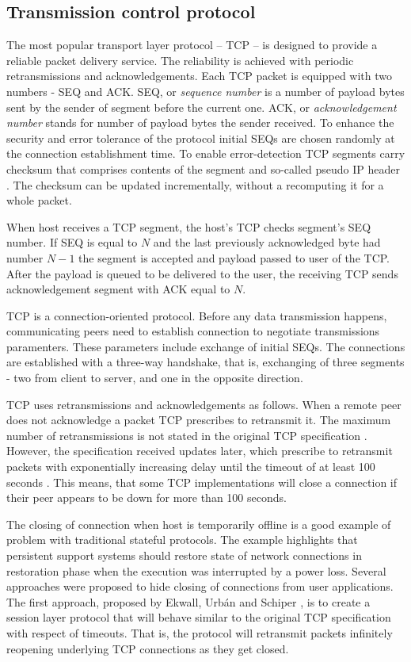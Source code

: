 \subsection{Transmission control protocol}

The most popular transport layer protocol -- TCP -- is designed to provide a 
reliable packet delivery service. The reliability is achieved with periodic
retransmissions and acknowledgements. Each TCP packet is equipped with two
numbers - SEQ and ACK. SEQ, or \textit{sequence number} is a number of payload
bytes sent by the sender of segment before the current one. ACK, or \textit{
acknowledgement number} stands for number of payload bytes the sender received.
To enhance the security and error tolerance of the protocol initial SEQs are
chosen randomly at the connection establishment time. To enable error-detection
TCP segments carry checksum that comprises contents of the segment and
so-called pseudo IP header \cite{tcp_ip_illustrated_vol2}. The checksum can be
updated incrementally, without a recomputing it for a whole packet.

When host receives a TCP segment, the host's TCP checks segment's SEQ number.
If SEQ is equal to $N$ and the last previously acknowledged byte had number
$N-1$ the segment is accepted and payload passed to user of the TCP. After the 
payload is queued to be delivered to the user, the receiving TCP sends
acknowledgement segment with ACK equal to $N$.

TCP is a connection-oriented protocol. Before any data transmission happens,
communicating peers need to establish connection to negotiate transmissions
paramenters. These parameters include exchange of initial SEQs. The connections
are established with a three-way handshake, that is, exchanging of three
segments - two from client to server, and one in the opposite direction.

TCP uses retransmissions and acknowledgements as follows. When a remote peer
does not acknowledge a packet TCP prescribes to retransmit it. The maximum
number of retransmissions is not stated in the original TCP specification
\cite{john1981transmission}.  However, the specification received updates
later, which prescribe to retransmit packets with exponentially increasing
delay \cite{rfc6298} until the timeout of at least 100 seconds \cite{rfc1122}.
This means, that some TCP implementations will close a connection if their
peer appears to be down for more than 100 seconds.

The closing of connection when host is temporarily offline is a good example of
problem with traditional stateful protocols. The example highlights that
persistent support systems should restore state of network connections in
restoration phase when the execution was interrupted by a power loss. Several
approaches were proposed to hide closing of connections from user applications.
The first approach, proposed by Ekwall, Urb{\'a}n and Schiper
\cite{ekwall2002robust}, is to create a session layer protocol that will behave
similar to the original TCP specification with respect of timeouts. That is,
the protocol will retransmit packets infinitely reopening underlying TCP
connections as they get closed.


